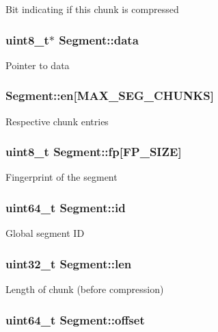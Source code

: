 \-Bit indicating if this chunk is compressed \hypertarget{structSegment_a40329b70e2e70cc9b8140c7ac4e60169}{
\subsubsection[{data}]{\setlength{\rightskip}{0pt plus 5cm}uint8\-\_\-t$\ast$ {\bf \-Segment\-::data}}}\label{structSegment_a40329b70e2e70cc9b8140c7ac4e60169}
\-Pointer to data \hypertarget{structSegment_a29a46e833355572e9929320f144cfc77}{
\subsubsection[{en}]{ {\bf \-Segment\-::en}\mbox{[}\-M\-A\-X\-\_\-\-S\-E\-G\-\_\-\-C\-H\-U\-N\-K\-S\mbox{]}}}\label{structSegment_a29a46e833355572e9929320f144cfc77}
\-Respective chunk entries \hypertarget{structSegment_ad1974f1d77fe441042034a92977879df}{
\subsubsection[{fp}]{\setlength{\rightskip}{0pt plus 5cm}uint8\-\_\-t {\bf \-Segment\-::fp}\mbox{[}{\bf \-F\-P\-\_\-\-S\-I\-Z\-E}\mbox{]}}}\label{structSegment_ad1974f1d77fe441042034a92977879df}
\-Fingerprint of the segment \hypertarget{structSegment_ab4221d4fc32571e537286e0b99ee7c71}{
\subsubsection[{id}]{\setlength{\rightskip}{0pt plus 5cm}uint64\-\_\-t {\bf \-Segment\-::id}}}\label{structSegment_ab4221d4fc32571e537286e0b99ee7c71}
\-Global segment \-I\-D \hypertarget{structSegment_aabdacebc169cc6edc842093f74ca2ad4}{
\subsubsection[{len}]{\setlength{\rightskip}{0pt plus 5cm}uint32\-\_\-t {\bf \-Segment\-::len}}}\label{structSegment_aabdacebc169cc6edc842093f74ca2ad4}
\-Length of chunk (before compression) \hypertarget{structSegment_a22561ad92e73f5ed788d9da666db78d2}{
\subsubsection[{offset}]{\setlength{\rightskip}{0pt plus 5cm}uint64\-\_\-t {\bf \-Segment\-::offset}}}\label{structSegment_a22561ad92e73f5ed788d9da666db78d2}
